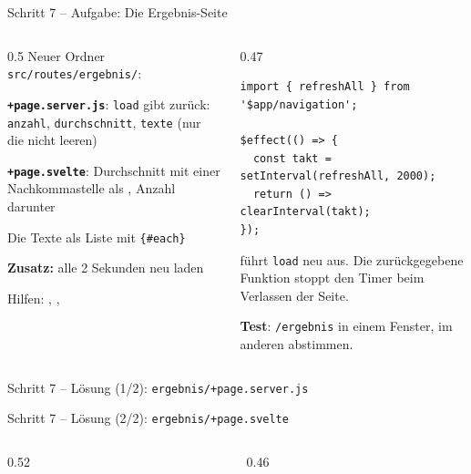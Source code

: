\begin{frame}[fragile]{Schritt 7 -- Aufgabe: Die Ergebnis-Seite}
  \footnotesize
  \begin{columns}[onlytextwidth,t]
    \begin{column}{0.5\textwidth}
      Neuer Ordner \texttt{src/routes/ergebnis/}:
      \begin{tugenumerate}
        \item \textbf{\texttt{+page.server.js}}: \texttt{load} gibt zurück:
              \texttt{anzahl}, \texttt{durchschnitt}, \texttt{texte}
              (nur die nicht leeren)
        \item \textbf{\texttt{+page.svelte}}: Durchschnitt mit einer
              Nachkommastelle als , Anzahl darunter
        \item Die Texte als Liste mit \texttt{\{\#each\}}
        \item \textbf{Zusatz:} alle 2 Sekunden neu laden
      \end{tugenumerate}
      \vspace{0.3em}
      Hilfen: , ,
    \end{column}
    \begin{column}{0.47\textwidth}
\begin{lstlisting}[style=sveltesm,numbers=none]
import { refreshAll } from '$app/navigation';

$effect(() => {
  const takt = setInterval(refreshAll, 2000);
  return () => clearInterval(takt);
});
\end{lstlisting}
       führt \texttt{load} neu aus. Die zurückgegebene
      Funktion stoppt den Timer beim Verlassen der Seite.

      \vspace{0.4em}
      \textbf{Test}: \texttt{/ergebnis} in einem Fenster, im anderen abstimmen.
    \end{column}
  \end{columns}
\end{frame}

\begin{loesung}
\begin{frame}[fragile]{Schritt 7 -- Lösung (1/2): \texttt{ergebnis/+page.server.js}}
\end{frame}

\begin{frame}[fragile]{Schritt 7 -- Lösung (2/2): \texttt{ergebnis/+page.svelte}}
  \begin{columns}[onlytextwidth,t]
    \begin{column}{0.52\textwidth}
    \end{column}
    \begin{column}{0.46\textwidth}
    \end{column}
  \end{columns}
\end{frame}
\end{loesung}

